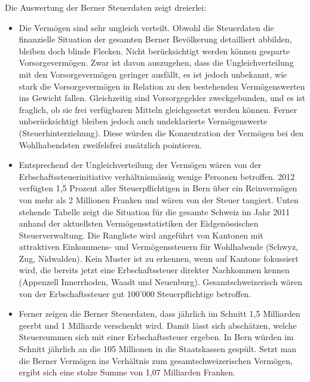 \documentclass[a4paper, 12pt,liststotoc]{scrartcl}
\numberwithin{equation}{section}
\begin{document}
Die Auswertung der Berner Steuerdaten zeigt dreierlei:

\begin{itemize}
\item
  Die Vermögen sind sehr ungleich verteilt. Obwohl die Steuerdaten die
  finanzielle Situation der gesamten Berner Bevölkerung detailliert
  abbilden, bleiben doch blinde Flecken. Nicht berücksichtigt werden
  können gesparte Vorsorgevermögen. Zwar ist davon auszugehen, dass die
  Ungleichverteilung mit den Vorsorgevermögen geringer ausfällt, es ist
  jedoch unbekannt, wie stark die Vorsorgevermögen in Relation zu den
  bestehenden Vermögenswerten ins Gewicht fallen. Gleichzeitig sind
  Vorsorgegelder zweckgebunden, und es ist fraglich, ob sie frei
  verfügbaren Mitteln gleichgesetzt werden können. Ferner
  unberücksichtigt bleiben jedoch auch undeklarierte Vermögenswerte
  (Steuerhinterziehung). Diese würden die Konzentration der Vermögen bei
  den Wohlhabendsten zweifelsfrei zusätzlich pointieren.
\item
  Entsprechend der Ungleichverteilung der Vermögen wären von der
  Erbschaftssteuerinitiative verhältnismässig wenige Personen betroffen.
  2012 verfügten 1,5 Prozent aller Steuerpflichtigen in Bern über ein
  Reinvermögen von mehr als 2 Millionen Franken und wären von der Steuer
  tangiert. Unten stehende Tabelle zeigt die Situation für die gesamte
  Schweiz im Jahr 2011 anhand der aktuellsten Vermögensstatistiken der
  Eidgenössischen Steuerverwaltung. Die Rangliste wird angeführt von
  Kantonen mit attraktiven Einkommens- und Vermögenssteuern für
  Wohlhabende (Schwyz, Zug, Nidwalden). Kein Muster ist zu erkennen,
  wenn auf Kantone fokussiert wird, die bereits jetzt eine
  Erbschaftssteuer direkter Nachkommen kennen (Appenzell Innerrhoden,
  Waadt und Neuenburg). Gesamtschweizerisch wären von der
  Erbschaftssteuer gut 100'000 Steuerpflichtige betroffen.
\item
  Ferner zeigen die Berner Steuerdaten, dass jährlich im Schnitt 1,5
  Milliarden geerbt und 1 Milliarde verschenkt wird. Damit lässt sich
  abschätzen, welche Steuersummen sich mit einer Erbschaftssteuer
  ergeben. In Bern würden im Schnitt jährlich an die 105 Millionen in
  die Staatskassen gespült. Setzt man die Berner Vermögen ins Verhältnis
  zum gesamtschweizerischen Vermögen, ergibt sich eine stolze Summe von
  1,07 Milliarden Franken.
\end{itemize}
\end{document}
